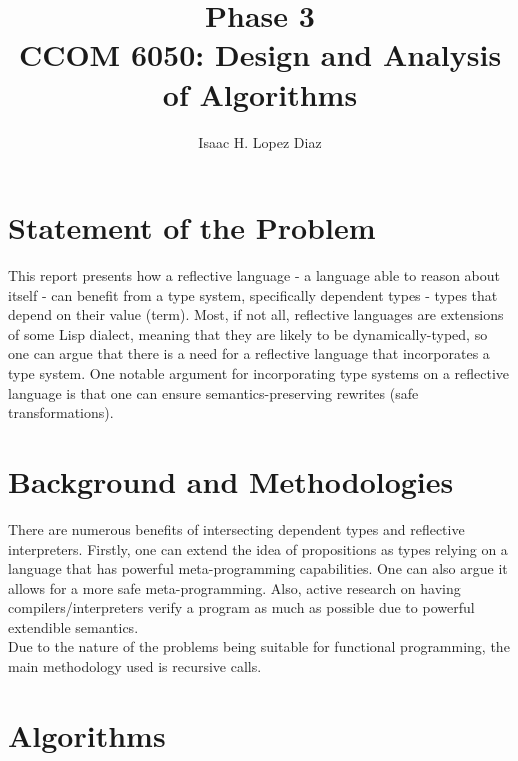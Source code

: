 \documentclass{article}
\title{Phase 3 \\ CCOM 6050: Design and Analysis of Algorithms}
\author{Isaac H. Lopez Diaz}
\begin{document}
\maketitle

\section{Statement of the Problem}
This report presents how a reflective language - a language able to reason about itself - can
benefit from a type system, specifically dependent types - types that depend on their value (term).
Most, if not all, reflective languages are extensions of some Lisp dialect, meaning that they are
likely to be dynamically-typed, so one can argue that there is a need for a reflective language
that incorporates a type system. One notable argument for incorporating type systems on a
reflective language is that one can ensure semantics-preserving rewrites (safe transformations).

\section{Background and Methodologies}
There are numerous benefits of intersecting dependent types and reflective interpreters. Firstly, one can extend the idea of propositions as types
relying on a language that has powerful meta-programming capabilities. One can also argue it allows for a more safe meta-programming.
Also, active research on having compilers/interpreters verify a program as much as possible due to powerful extendible semantics. \\
Due to the nature of the problems being suitable for functional programming, the main methodology used is recursive calls.

\section{Algorithms}
\end{document}
